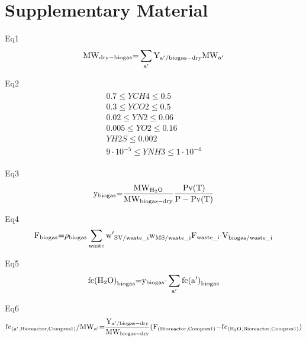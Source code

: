 \documentclass[10pt,a4paper]{article}
\begin{document}
\section{Supplementary Material}
Eq1
\begin{align}
	{\rm{M}}{{\rm{W}}_{{\rm{dry - biogas}}}}{\rm{ = }}\sum\limits_{{\rm{a'}}} {{{\rm{Y}}_{{\rm{a'/biogas - dry}}}}{\rm{M}}{{\rm{W}}_{{\rm{a'}}}}}
\end{align}

Eq2
\begin{align}
	\begin{array}{l}
	0.7 \le YCH4 \le 0.5 \\
	0.3 \le YCO2 \le 0.5 \\
	0.02 \le YN2 \le 0.06 \\
	0.005 \le YO2 \le 0.16 \\
	YH2S \le 0.002 \\
	9 \cdot 10^{-5} \le YNH3 \le 1 \cdot 10^{-4}\end{array}	
\end{align}

Eq3
\begin{align}
	{{\rm{y}}_{{\rm{biogas}}}}{\rm{ = }}\frac{{{\rm{M}}{{\rm{W}}_{{{\rm{H}}_{\rm{2}}}{\rm{O}}}}}}{{{\rm{M}}{{\rm{W}}_{{\rm{biogas - dry}}}}}}\frac{{{\rm{Pv(T)}}}}{{{\rm{P - Pv(T)}}}}
\end{align}

Eq4
\begin{align}
	{{\rm{F}}_{{\rm{biogas}}}}{\rm{ = }}{{\rm{\rho }}_{{\rm{biogas}}}}\sum\limits_{{\rm{waste}}} {{\rm{w}}{{\rm{'}}_{{\rm{SV/waste\_i}}}}{{\rm{w}}_{{\rm{MS/waste\_i}}}}{{\rm{F}}_{{\rm{waste\_i}}}}{\rm{\cdot}}{{\rm{V}}_{{\rm{biogas/waste\_i}}}}}
\end{align}

Eq5
\begin{align}
	{\rm{fc(}}{{\rm{H}}_{\rm{2}}}{\rm{O}}{{\rm{)}}_{{\rm{biogas}}}}{\rm{ = }}{{\rm{y}}_{{\rm{biogas}}}}{\rm{\cdot}}\sum\limits_{{\rm{a'}}} {{\rm{fc(a'}}{{\rm{)}}_{{\rm{biogas}}}}}
\end{align}

Eq6
\begin{align}
	{\rm{f}}{{\rm{c}}_{{\rm{(a',Bioreactor,Compres1)}}}}{\rm{/M}}{{\rm{W}}_{{\rm{a'}}}}{\rm{ = }}\frac{{{{\rm{Y}}_{{\rm{a'/biogas - dry}}}}}}{{{\rm{M}}{{\rm{W}}_{{\rm{biogas - dry}}}}}}{\rm{(}}{{\rm{F}}_{{\rm{(Bioreactor,Compres1)}}}}{\rm{ - f}}{{\rm{c}}_{{\rm{(}}{{\rm{H}}_{\rm{2}}}{\rm{O,Bioreactor,Compres1)}}}}{\rm{)}}
\end{align}
\end{document}
